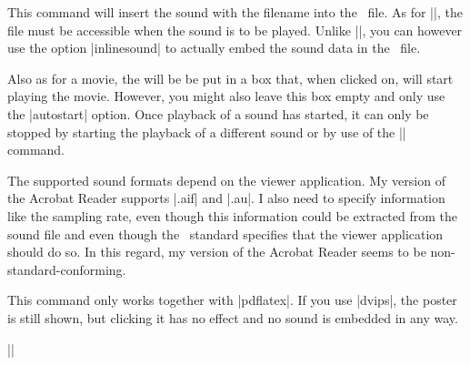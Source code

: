 \begin{command}{\sound{}}
  This command will insert the sound with the filename  into the \pdf\ file. As for |\movie|, the file must be
  accessible when the sound is to be played. Unlike |\movie|, you can
  however use the option |inlinesound| to actually embed the sound
  data in the \pdf\ file. 

  Also as for a movie, the  will be be put in
  a box that, when clicked on, will start playing the movie. However,
  you might also leave this box empty and only use the |autostart|
  option. Once playback of a sound has started, it can only be stopped
  by starting the playback of a different sound or by use of the
  |\hyperlinkmute| command. 
  
  The supported sound formats depend on the viewer application. My
  version of the Acrobat Reader supports |.aif| and |.au|. I also need
  to specify information like the sampling rate, even though this
  information could be extracted from the sound file and even though
  the \pdf\ standard specifies that the viewer application should do
  so. In this regard, my version of the Acrobat Reader seems to be
  non-standard-conforming.

  This command only works together with |pdflatex|. If you use
  |dvips|, the poster is still shown, but clicking it has no effect
  and no sound is embedded in any way.

  \example
  ||


\end{command}
